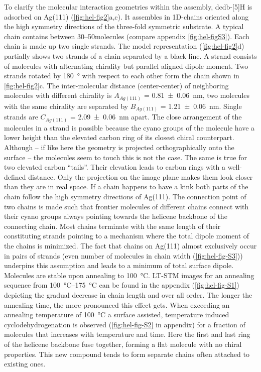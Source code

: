 To clarify the molecular interaction geometries within the assembly, dcdb-[5]H is adsorbed on Ag(111) (\autoref{fig:hel-fig2}a,c).  It assembles in 1D-chains oriented along the high symmetry directions of the three-fold symmetric substrate. A typical chain contains between \SIrange{30}{50}{}molecules (compare appendix \autoref{fig:hel-figS3}). Each chain is made up two single strands. The model representation (\autoref{fig:hel-fig2}d) partially shows two strands of a chain separated by a black line. A strand consists of molecules with alternating chirality but parallel aligned dipole moment. Two strands rotated by \SI{180}{\degree} with respect to each other form the chain shown in \autoref{fig:hel-fig2}c. The inter-molecular distance (center-center) of neighboring molecules with different chirality is $A_{Ag(111)}$ = \SI{0.81 \pm 0.06}{\nano \meter}, two molecules with the same chirality are separated by $B_{Ag(111)}$ = \SI{1.21 \pm 0.06}{\nano \meter}. Single strands are $C_{Ag(111)}$ = \SI{2.09 \pm 0.06}{\nano \meter} apart. The close arrangement of the molecules in a strand is possible because the cyano groups of the molecule have a lower height than the elevated carbon ring of its closest chiral counterpart. Although – if like here the geometry is projected orthographically onto the surface – the molecules seem to touch this is not the case. The same is true for two elevated carbon “tails”. Their elevation leads to carbon rings with a well-defined distance. Only the projection on the image plane makes them look closer than they are in real space. If a chain happens to have a kink both parts of the chain follow the high symmetry directions of Ag(111). The connection point of two chains is made such that frontier molecules of different chains connect with their cyano groups always pointing towards the helicene backbone of the connecting chain. Most chains terminate with the same length of their constituting strands pointing to a mechanism where the total dipole moment of the chains is minimized. The fact that chains on Ag(111) almost exclusively occur in pairs of strands (even number of molecules in chain width (\autoref{fig:hel-fig-S3})) underpins this assumption and leads to a minimum of total surface dipole. Molecules are stable upon annealing to \SI{100}{\celsius}. LT-STM images for an annealing sequence from \SIrange{100}{175}{\celsius} can be found in the appendix (\autoref{fig:hel-fig-S1}) depicting the gradual decrease in chain length and over all order. The longer the annealing time, the more pronounced this effect gets. When exceeding an annealing temperature of \SI{100}{\celsius} a surface assisted, temperature induced cyclodehydrogenation is observed (\autoref{fig:hel-fig-S2} in appendix) for a fraction of molecules that increases with temperature and time. Here the first and last ring of the helicene backbone fuse together, forming a flat molecule with no chiral properties. This new compound tends to form separate chains often attached to existing ones. 

